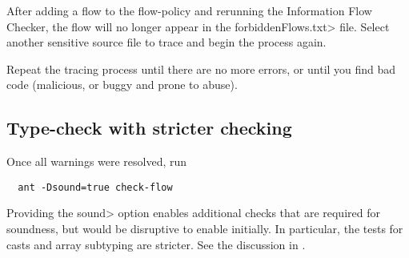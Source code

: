 After adding a flow to the flow-policy and rerunning the Information Flow Checker, the flow
will no longer appear in the \<forbiddenFlows.txt> file. Select another sensitive
source file to trace and begin the process again.

Repeat the tracing process until there are no more errors, or until you find bad code
(malicious, or buggy and prone to abuse).

\subsection{Type-check with stricter checking}

Once all warnings were resolved, run 

\begin{Verbatim}
  ant -Dsound=true check-flow
\end{Verbatim}

\noindent
Providing the \<sound> option enables additional checks that are
required for soundness, but would be disruptive to enable initially.
In particular, the tests for casts and array subtyping are stricter.
See the discussion in .



